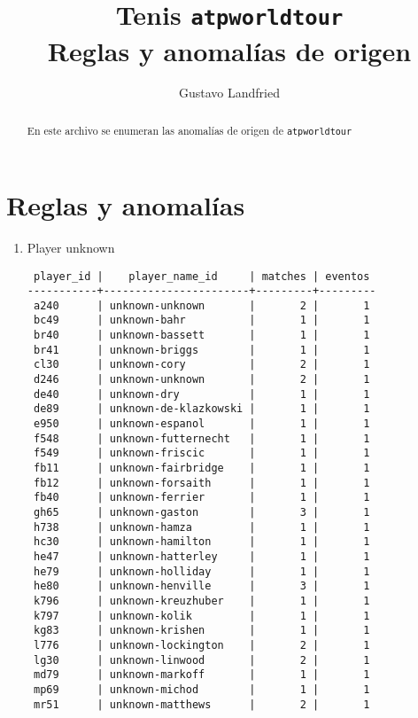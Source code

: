 \documentclass[a4paper,10pt]{article}
\title{Tenis \texttt{atpworldtour} \\ Reglas y anomal\'ias de origen  }
\author{Gustavo Landfried}
\begin{document}
\maketitle

\begin{abstract}
 
 En este archivo se enumeran las anomal\'ias de origen de \texttt{atpworldtour}
 
\end{abstract}

\section*{Reglas y anomal\'ias}

\begin{enumerate}

\item Player unknown
\begin{verbatim}
 player_id |    player_name_id     | matches | eventos 
-----------+-----------------------+---------+---------
 a240      | unknown-unknown       |       2 |       1
 bc49      | unknown-bahr          |       1 |       1
 br40      | unknown-bassett       |       1 |       1
 br41      | unknown-briggs        |       1 |       1
 cl30      | unknown-cory          |       2 |       1
 d246      | unknown-unknown       |       2 |       1
 de40      | unknown-dry           |       1 |       1
 de89      | unknown-de-klazkowski |       1 |       1
 e950      | unknown-espanol       |       1 |       1
 f548      | unknown-futternecht   |       1 |       1
 f549      | unknown-friscic       |       1 |       1
 fb11      | unknown-fairbridge    |       1 |       1
 fb12      | unknown-forsaith      |       1 |       1
 fb40      | unknown-ferrier       |       1 |       1
 gh65      | unknown-gaston        |       3 |       1
 h738      | unknown-hamza         |       1 |       1
 hc30      | unknown-hamilton      |       1 |       1
 he47      | unknown-hatterley     |       1 |       1
 he79      | unknown-holliday      |       1 |       1
 he80      | unknown-henville      |       3 |       1
 k796      | unknown-kreuzhuber    |       1 |       1
 k797      | unknown-kolik         |       1 |       1
 kg83      | unknown-krishen       |       1 |       1
 l776      | unknown-lockington    |       2 |       1
 lg30      | unknown-linwood       |       2 |       1
 md79      | unknown-markoff       |       1 |       1
 mp69      | unknown-michod        |       1 |       1
 mr51      | unknown-matthews      |       2 |       1

\end{verbatim}
\end{enumerate}
\end{document}
